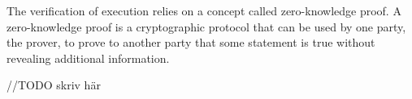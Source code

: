 
The verification of execution relies on a concept called
zero-knowledge proof. A zero-knowledge proof is a cryptographic
protocol that can be used by one party, the prover, to prove to
another party that some statement is true without revealing additional
information.

//TODO skriv här

\begin{center}
\end{center}

